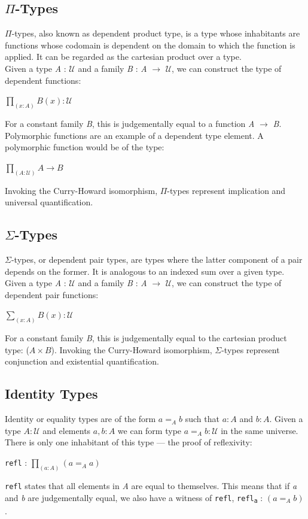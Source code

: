 \documentclass[12pt]{report}
\begin{document}
\subsection{$\Pi$-Types}
$\Pi$-types, also known as dependent product type, is a type whose inhabitants are functions whose codomain is dependent on the domain to which the function is applied. It can be regarded as the cartesian product over a type.\\
Given a type \textit{A} : $\mathcal{U}$ and a family \textit{B} : \textit{A} $\rightarrow$ $\mathcal{U}$, we can construct the type of dependent functions:
\begin{center}
$ \prod_{(x:A)}^{} B(x) : \mathcal{U} $
\end{center}
For a constant family \textit{B}, this is judgementally equal to a function \textit{A} $\rightarrow$ \textit{B}.\\
Polymorphic functions are an example of a dependent type element. A polymorphic function would be of the type:
\begin{center}
$ \prod_{(A:\mathcal{U})}^{} A \rightarrow B $
\end{center}
Invoking the Curry-Howard isomorphism, $\Pi$-types represent implication and universal quantification.


\subsection{$\Sigma$-Types}
$\Sigma$-types, or dependent pair types, are types where the latter component of a pair depends on the former. It is analogous to an indexed sum over a given type. 
Given a type \textit{A} : $\mathcal{U}$ and a family \textit{B} : \textit{A} $\rightarrow$ $\mathcal{U}$, we can construct the type of dependent pair functions:
\begin{center}
$ \sum_{(x:A)}^{} B(x) : \mathcal{U} $
\end{center}
For a constant family \textit{B}, this is judgementally equal to the cartesian product type: ($A \times B$).
Invoking the Curry-Howard isomorphism, $\Sigma$-types represent conjunction and existential quantification.
\subsection{Identity Types}
Identity or equality types are of the form $a =_A b$ such that $a : A$ and $b : A$. Given a type $A : \mathcal{U}$ and elements $a,b : A$ we can form type $a =_A b : \mathcal{U}$ in the same universe. There is only one inhabitant of this type --- the proof of reflexivity:
\begin{center}
 \texttt{refl} : $\prod_{(a:A)}^{} (a =_A a) $
\end{center}
\texttt{refl} states that all elements in \textit{A} are equal to themselves. This means that if \textit{a} and \textit{b} are judgementally equal, we also have a witness of \texttt{refl},  \texttt{refl\textsubscript{a}} : $(a =_A b)$.
\end{document}

